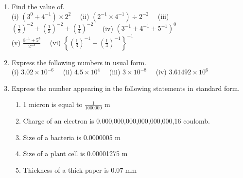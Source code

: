 \documentclass[a4paper,leqno,12pt]{amsart}
\begin{document}
\begin{enumerate}
\item Find the value of.\\
(i) $(3^0  + 4^{-1}) \times 2^2 \quad $ (ii) $(2^{-1} \times 4^{-1}) \div 2^{-2} \quad$ (iii) $\left(\frac{1}{2} \right)^{-2} + \left(\frac{1}{3} \right)^{-2} + \left(\frac{1}{4} \right)^{-2} \quad$ (iv) $(3^{-1} + 4^{-1} + 5^{-1})^0$\\
(v) $\frac{8^{-1} + 5^3}{2^{-4}} \quad$ (vi) $\left\{\left(\frac{1}{3}\right)^{-1} -\left(\frac{1}{4}\right)^{-1} \right\}^{-1}$

\item Express the following numbers in usual form.\\
(i) $3.02 \times 10^{-6} \quad$ (ii) $4.5 \times 10^4 \quad$ (iii) $3 \times 10^{-8} \quad $ (iv) $3.61492 \times 10^6$

\item Express the number appearing in the following statements in standard form.\\
\begin{enumerate}
 \item 1 micron is equal to $\frac{1}{1000000}$ m
 \item Charge of an electron is 0.000,000,000,000,000,000,16 coulomb.
 \item Size of a bacteria is 0.0000005 m
 \item Size of a plant cell is 0.00001275 m
 \item Thickness of a thick paper is 0.07 mm
\end{enumerate}

\end{enumerate}


\end{document}
